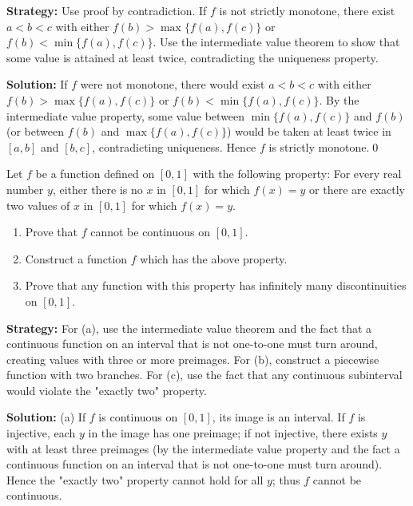 \noindent\textbf{Strategy:} Use proof by contradiction. If $f$ is not strictly monotone, there exist $a < b < c$ with either $f(b) > \max\{f(a), f(c)\}$ or $f(b) < \min\{f(a), f(c)\}$. Use the intermediate value theorem to show that some value is attained at least twice, contradicting the uniqueness property.

\bigskip\noindent\textbf{Solution:}
If $f$ were not monotone, there would exist $a<b<c$ with either $f(b)>\max\{f(a),f(c)\}$ or $f(b)<\min\{f(a),f(c)\}$. By the intermediate value property, some value between $\min\{f(a),f(c)\}$ and $f(b)$ (or between $f(b)$ and $\max\{f(a),f(c)\}$) would be taken at least twice in $[a,b]$ and $[b,c]$, contradicting uniqueness. Hence $f$ is strictly monotone.\qed



\begin{problembox}
\begin{problemstatement}
Let \( f \) be a function defined on \([0, 1]\) with the following property: For every real number \( y \), either there is no \( x \) in \([0, 1]\) for which \( f(x) = y \) or there are exactly two values of \( x \) in \([0, 1]\) for which \( f(x) = y \).
\begin{enumerate}[label=(\alph*)]
\item Prove that \( f \) cannot be continuous on \([0, 1]\).
\item Construct a function \( f \) which has the above property.
\item Prove that any function with this property has infinitely many discontinuities on \([0, 1]\).
\end{enumerate}
\end{problemstatement}
\end{problembox}

\noindent\textbf{Strategy:} For (a), use the intermediate value theorem and the fact that a continuous function on an interval that is not one-to-one must turn around, creating values with three or more preimages. For (b), construct a piecewise function with two branches. For (c), use the fact that any continuous subinterval would violate the "exactly two" property.

\bigskip\noindent\textbf{Solution:}
(a) If $f$ is continuous on $[0,1]$, its image is an interval. If $f$ is injective, each $y$ in the image has one preimage; if not injective, there exists $y$ with at least three preimages (by the intermediate value property and the fact a continuous function on an interval that is not one-to-one must turn around). Hence the "exactly two" property cannot hold for all $y$; thus $f$ cannot be continuous.

